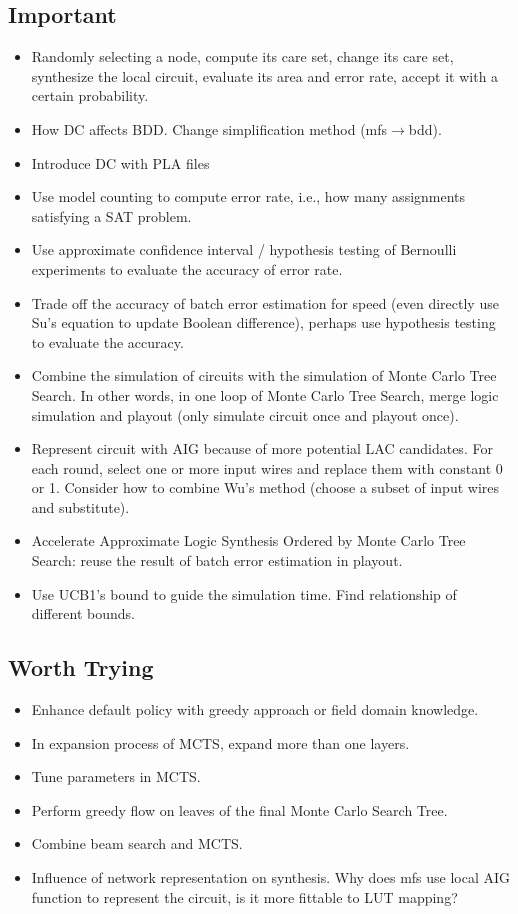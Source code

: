 \documentclass{rpt}
\begin{document}
\subsection{Important}
\begin{itemize}
    \item
        Randomly selecting a node,
        compute its care set,
        change its care set,
        synthesize the local circuit,
        evaluate its area and error rate,
        accept it with a certain probability.
    \item How DC affects BDD\@.
        Change simplification method (mfs$\rightarrow$bdd).
    \item Introduce DC with PLA files
    \item Use model counting to compute error rate, i.e., how many assignments satisfying a SAT problem.
    \item Use approximate confidence interval / hypothesis testing of Bernoulli experiments to evaluate the accuracy of error rate.
    \item Trade off the accuracy of batch error estimation for speed
        (even directly use Su's equation to update Boolean difference),
        perhaps use hypothesis testing to evaluate the accuracy.
    \item Combine the simulation of circuits with the simulation of Monte Carlo Tree Search.
        In other words,
        in one loop of Monte Carlo Tree Search,
        merge logic simulation and playout (only simulate circuit once and playout once).
    \item Represent circuit with AIG because of more potential LAC candidates.
        For each round, select one or more input wires and replace them with constant 0 or 1.
        Consider how to combine Wu's method (choose a subset of input wires and substitute).
    \item Accelerate Approximate Logic Synthesis Ordered by Monte Carlo Tree Search:
        reuse the result of batch error estimation in playout.
    \item
        Use UCB1's bound to guide the simulation time.
        Find relationship of different bounds.
\end{itemize}

\subsection{Worth Trying}
\begin{itemize}
    \item Enhance default policy with greedy approach or field domain knowledge.
    \item In expansion process of MCTS, expand more than one layers.
    \item Tune parameters in MCTS\@.
    \item Perform greedy flow on leaves of the final Monte Carlo Search Tree.
    \item Combine beam search and MCTS\@.
    \item
        Influence of network representation on synthesis.
        Why does mfs use local AIG function to represent the circuit,
        is it more fittable to LUT mapping?
\end{itemize}
\end{document}
